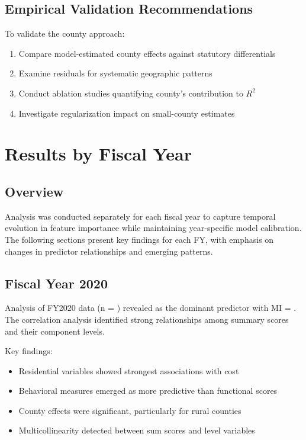 \subsection{Empirical Validation Recommendations}

To validate the county approach:
\begin{enumerate}
    \item Compare model-estimated county effects against statutory differentials
    \item Examine residuals for systematic geographic patterns
    \item Conduct ablation studies quantifying county's contribution to $R^2$
    \item Investigate regularization impact on small-county estimates
\end{enumerate}

\newpage 

\section{Results by Fiscal Year}

\subsection{Overview}

Analysis was conducted separately for each fiscal year to capture temporal evolution in feature importance while maintaining year-specific model calibration. The following sections present key findings for each FY, with emphasis on changes in predictor relationships and emerging patterns.

\subsection{Fiscal Year 2020}

Analysis of FY2020 data (n = \FSRecordsFinalFYTwoThousandTwenty) revealed \FSTopFeatureFYTwoThousandTwenty{} as the dominant predictor with MI = \FSTopMIFYTwoThousandTwenty. The correlation analysis identified strong relationships among summary scores and their component levels.

Key findings:
\begin{itemize}
    \item Residential variables showed strongest associations with cost
    \item Behavioral measures emerged as more predictive than functional scores
    \item County effects were significant, particularly for rural counties
    \item Multicollinearity detected between sum scores and level variables
\end{itemize}

